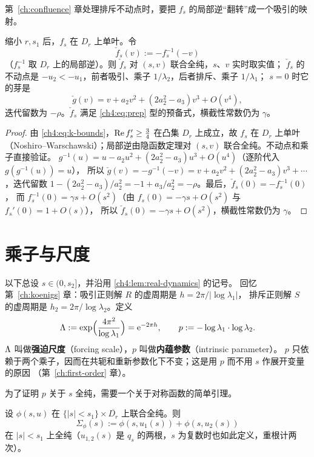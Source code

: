 第~\ref{ch:confluence} 章处理排斥不动点时，要把 $f_s$ 的局部逆``翻转''成一个吸引的映射。

\begin{lemma}[反射逆]\label{ch4:lem:reflected}
缩小 $r,s_1$ 后，$f_s$ 在 $D_r$ 上单叶。令
\[
 \check f_s(v):=-f_s^{-1}(-v)
\]
（$f_s^{-1}$ 取 $D_r$ 上的局部逆）。则 $\check f_s$ 对 $(s,v)$ 联合全纯，$s$、$v$ 实时取实值；
$\check f_s$ 的不动点是 $-u_2<-u_1$，前者吸引、乘子 $1/\lambda_2$，后者排斥、乘子 $1/\lambda_1$；
$s=0$ 时它的芽是
\[
 \check g(v)=v+a_2v^2+(2a_2^2-a_3)v^3+O(v^4),
\]
迭代留数为 $-\rho$。$\check f_s$ 满足 \eqref{ch4:eq:prep} 型的预备式，横截性常数仍为 $\gamma$。
\end{lemma}

\begin{proof}
由 \eqref{ch4:eq:k-bounds}，$\operatorname{Re} f_s'\ge\frac34$ 在凸集 $D_r$ 上成立，故 $f_s$ 在 $D_r$ 上单叶
（Noshiro--Warschawski）；局部逆由隐函数定理对 $(s,v)$ 联合全纯。不动点和乘子直接验证。
$g^{-1}(u)=u-a_2u^2+(2a_2^2-a_3)u^3+O(u^4)$（逐阶代入 $g(g^{-1}(u))=u$），
所以 $\check g(v)=-g^{-1}(-v)=v+a_2v^2+(2a_2^2-a_3)v^3+\cdots$，迭代留数
$1-(2a_2^2-a_3)/a_2^2=-1+a_3/a_2^2=-\rho$。最后，$\check f_s(0)=-f_s^{-1}(0)$，
而 $f_s^{-1}(0)=\gamma s+O(s^2)$（由 $f_s(0)=-\gamma s+O(s^2)$ 与 $f_s'(0)=1+O(s)$），
所以 $\check f_s(0)=-\gamma s+O(s^2)$，横截性常数仍为 $\gamma$。
\end{proof}

\section{乘子与尺度}\label{ch4:sec:scales}

以下总设 $s\in(0,s_2]$，并沿用 \cref{ch4:lem:real-dynamics} 的记号。
回忆第~\ref{ch:koenigs} 章：吸引正则解 $R$ 的虚周期是 $h=2\pi/|\log\lambda_1|$，
排斥正则解 $S$ 的虚周期是 $h_2=2\pi/\log\lambda_2$。定义
\begin{equation}\label{ch4:eq:Lam-p}
 \Lambda:=\exp\Bigl(\frac{4\pi^2}{\log\lambda_1}\Bigr)=\mathrm{e}^{-2\pi h},\qquad
 p:=-\log\lambda_1\cdot\log\lambda_2 .
\end{equation}
$\Lambda$ 叫做\textbf{强迫尺度}（forcing scale），$p$ 叫做\textbf{内蕴参数}（intrinsic parameter）。
$p$ 只依赖于两个乘子，因而在共轭和重新参数化下不变；这是用 $p$ 而不用 $s$ 作展开变量的原因
（第~\ref{ch:first-order} 章）。

为了证明 $p$ 关于 $s$ 全纯，需要一个关于对称函数的简单引理。

\begin{lemma}[根的幂和]\label{ch4:lem:power-sums}
设 $\phi(s,u)$ 在 $\{|s|<s_1\}\times\overline{D_r}$ 上联合全纯。则
\[
 \Sigma_\phi(s):=\phi(s,u_1(s))+\phi(s,u_2(s))
\]
在 $|s|<s_1$ 上全纯（$u_{1,2}(s)$ 是 $q_s$ 的两根，$s$ 为复数时也如此定义，重根计两次）。
\end{lemma}

